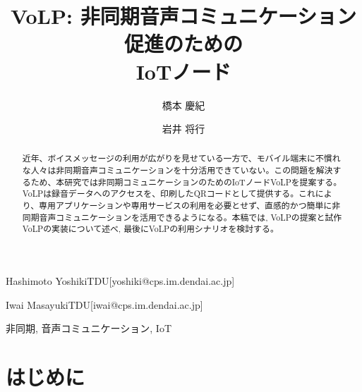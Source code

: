 \documentclass[submit,techrep,noauthor]{ipsj}
\begin{document}
\title{VoLP: 非同期音声コミュニケーション促進のための\\IoTノード}

\author{橋本 慶紀}{Hashimoto Yoshiki}{TDU}[yoshiki@cps.im.dendai.ac.jp]
\author{岩井 将行}{Iwai Masayuki}{TDU}[iwai@cps.im.dendai.ac.jp]

\begin{abstract}
近年、ボイスメッセージの利用が広がりを見せている一方で、モバイル端末に不慣れな人々は非同期音声コミュニケーションを十分活用できていない。この問題を解決するため、本研究では非同期コミュニケーションのためのIoTノードVoLPを提案する。VoLPは録音データへのアクセスを、印刷したQRコードとして提供する。これにより、専用アプリケーションや専用サービスの利用を必要とせず、直感的かつ簡単に非同期音声コミュニケーションを活用できるようになる。本稿では, VoLPの提案と試作VoLPの実装について述べ, 最後にVoLPの利用シナリオを検討する。

\end{abstract}

\begin{jkeyword}
非同期, 音声コミュニケーション, IoT
\end{jkeyword}

\maketitle

\section{はじめに}

\end{document}
